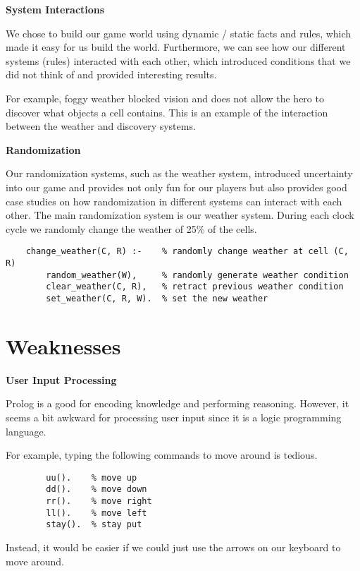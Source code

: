 \documentclass[10pt]{article}
\begin{document}
\textbf{System Interactions}

We chose to build our game world using dynamic / static facts and rules, which made it easy for us build the world. Furthermore, we can see how our different systems (rules) interacted with each other, which introduced conditions that we did not think of and provided interesting results.

For example, foggy weather blocked vision and does not allow the hero to discover what objects a cell contains. This is an example of the interaction between the weather and discovery systems.

\textbf{Randomization}

Our randomization systems, such as the weather system, introduced uncertainty into our game and provides not only fun for our players but also provides good case studies on how randomization in different systems can interact with each other. The main randomization system is our weather system. During each clock cycle we randomly change the weather of 25\% of the cells.

\begin{verbatim}
    change_weather(C, R) :-    % randomly change weather at cell (C, R)
        random_weather(W),     % randomly generate weather condition
        clear_weather(C, R),   % retract previous weather condition
        set_weather(C, R, W).  % set the new weather
\end{verbatim}




\section{Weaknesses}

\textbf{User Input Processing}

Prolog is a good for encoding knowledge and performing reasoning. However, it seems a bit awkward for processing user input since it is a logic programming language.

For example, typing the following commands to move around is tedious.

\begin{verbatim}
        uu().    % move up
        dd().    % move down
        rr().    % move right
        ll().    % move left
        stay().  % stay put
\end{verbatim}

Instead, it would be easier if we could just use the arrows on our keyboard to move around.
\end{document}
